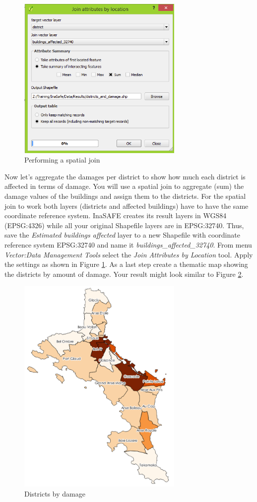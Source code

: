 \documentclass[a4paper,12pt,titlepage]{article}
\begin{document}
\begin{figure}[htb]
	\centering
	\includegraphics[width=8cm]{Images/spatial_join.png}
	\caption{Performing a spatial join}\label{fig:spatial_join}
\end{figure}

Now let's aggregate the damages per district to show how much each district is affected in terms of damage. You will use a spatial join to aggregate (sum) the damage values of the buildings and assign them to the districts. For the spatial join to work both layers (districts and affected buildings) have to have the same coordinate reference system. InaSAFE creates its result layers in WGS84 (EPSG:4326) while all your original Shapefile layers are in EPSG:32740. Thus, save the \textit{Estimated buildings affected} layer to a new Shapefile with coordinate reference system EPSG:32740 and name it \textit{buildings\_affected\_32740}. From menu \textit{Vector:Data Management Tools} select the \textit{Join Attributes by Location} tool. Apply the settings as shown in Figure \ref{fig:spatial_join}. As a last step create a thematic map showing the districts by amount of damage. Your result might look  similar to Figure \ref{fig:districts_by_damage}.

\begin{figure}[htb]
	\centering
	\includegraphics[width=8cm]{Images/districts_by_damage.png}
	\caption{Districts by damage}\label{fig:districts_by_damage}
\end{figure}
\end{document}
